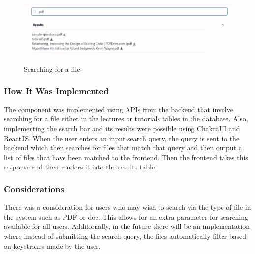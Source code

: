 \begin{figure}[h!]
    \includegraphics[scale=0.3]{images/lat-search.png}
    \centering
    \caption{Searching for a file}
\end{figure}

\subsubsection{How It Was Implemented}
The component was implemented using APIs from the backend that involve searching for a file either in the lectures or tutorials tables in the database. Also, implementing the search bar and its results were possible using ChakraUI and ReactJS. When the user enters an input search query, the query is sent to the backend which then searches for files that match that query and then output a list of files that have been matched to the frontend. Then the frontend takes this response and then renders it into the results table.

\subsubsection{Considerations}
There was a consideration for users who may wish to search via the type of file in the system such as PDF or doc. This allows for an extra parameter for searching available for all users. Additionally, in the future there will be an implementation where instead of submitting the search query, the files automatically filter based on keystrokes made by the user.